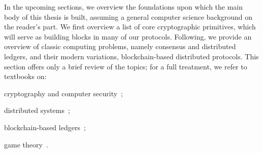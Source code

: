 In the upcoming sections, we overview the foundations upon which the main body
of this thesis is built, assuming a general computer science background on the reader's part. We
first overview a list of core cryptographic primitives, which will serve as
building blocks in many of our protocols. Following, we provide an overview of
classic computing problems, namely consensus and distributed ledgers, and their
modern variations, \ie blockchain-based distributed protocols. This section
offers only a brief review of the topics; for a full treatment, we refer to
textbooks on:
\begin{inparaenum}[i)]
    \item cryptography and computer
    security~\cite{katz2020introduction,goldreich2007foundations,goldreich2009foundations};
    \item distributed systems~\cite{koulouris2002distributed};
    \item blockchain-based ledgers~\cite{narayanan2016bitcoin};
    \item game theory~\cite{nisan2007algorithmic,straffin1993game,roughgarden2016twenty}.
\end{inparaenum}
